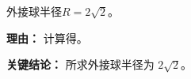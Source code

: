 \begin{examplebox}
\begin{description}[style=nextline, leftmargin=2.8em, labelsep=0.5em, itemsep=0.45em]
		\item[\textbf{第三步（写出答案）：}] 外接球半径$R = 2\sqrt{2}$。
			\par\textbf{理由：} 计算得。
	\end{description}

	\textbf{\textcolor{CExample}{关键结论：}}
	所求外接球半径为 $2\sqrt{2}$。

\end{examplebox}
